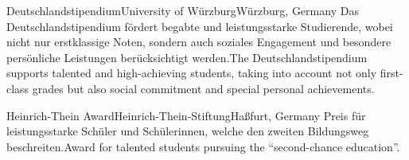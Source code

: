\begin{cventries}
	{Deutschlandstipendium}{University of Würzburg}{Würzburg, Germany}%
    {}%
    {Das Deutschlandstipendium fördert begabte und leistungsstarke Studierende, wobei nicht nur erstklassige Noten, sondern auch soziales Engagement und besondere persönliche Leistungen berücksichtigt werden.}{The Deutschlandstipendium supports talented and high-achieving students, taking into account not only first-class grades but also social commitment and special personal achievements.}

	{Heinrich-Thein Award}{Heinrich-Thein-Stiftung}{Haßfurt, Germany}%
    {}%
    {Preis für leistungsstarke Schüler und Schülerinnen, welche den zweiten Bildungsweg beschreiten.}{Award for talented students pursuing the ``second-chance education''.}

\end{cventries}